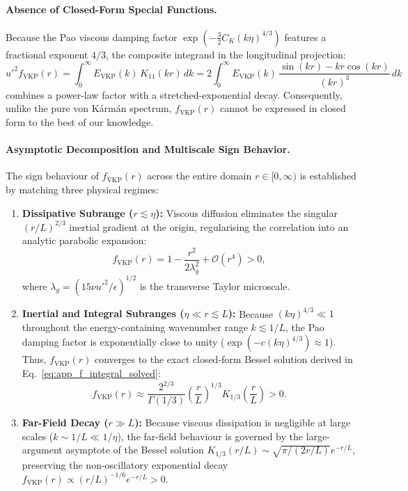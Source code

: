 \documentclass[lineno]{jfm}
\begin{document}
\paragraph{Absence of Closed-Form Special Functions.}
Because the Pao viscous damping factor $\exp(-\frac{3}{2} C_K (k\eta)^{4/3})$ features a fractional exponent $4/3$, the composite integrand in the longitudinal projection:
\begin{equation}
u'^2 f_{\text{VKP}}(r) = \int_0^\infty E_{\text{VKP}}(k)\,K_{11}(kr)\,dk = 2 \int_0^\infty E_{\text{VKP}}(k)\,\frac{\sin(kr) - kr\cos(kr)}{(kr)^3}\,dk
\end{equation}
combines a power-law factor with a stretched-exponential decay. Consequently, unlike the pure von K\'arm\'an spectrum, $f_{\text{VKP}}(r)$ cannot be expressed in closed form to the best of our knowledge.

\paragraph{Asymptotic Decomposition and Multiscale Sign Behavior.}
The sign behaviour of $f_{\text{VKP}}(r)$ across the entire domain $r \in [0, \infty)$ is established by matching three physical regimes:
\begin{enumerate}
\item \textbf{Dissipative Subrange ($r \lesssim \eta$):} Viscous diffusion eliminates the singular $(r/L)^{2/3}$ inertial gradient at the origin, regularising the correlation into an analytic parabolic expansion:
\begin{equation}
f_{\text{VKP}}(r) = 1 - \frac{r^2}{2\lambda_g^2} + \mathcal{O}(r^4) > 0,
\end{equation}
where $\lambda_g = \left( 15\nu u'^2/\epsilon \right)^{1/2}$ is the transverse Taylor microscale.
\item \textbf{Inertial and Integral Subranges ($\eta \ll r \lesssim L$):} Because $(k\eta)^{4/3} \ll 1$ throughout the energy-containing wavenumber range $k \lesssim 1/L$, the Pao damping factor is exponentially close to unity ($\exp(-c(k\eta)^{4/3}) \approx 1$). Thus, $f_{\text{VKP}}(r)$ converges to the exact closed-form Bessel solution derived in Eq.~\eqref{eq:app_f_integral_solved}:
\begin{equation}
f_{\text{VKP}}(r) \approx \frac{2^{2/3}}{\Gamma(1/3)}\left(\frac{r}{L}\right)^{1/3} K_{1/3}\left(\frac{r}{L}\right) > 0.
\end{equation}
\item \textbf{Far-Field Decay ($r \gg L$):} Because viscous dissipation is negligible at large scales ($k \sim 1/L \ll 1/\eta$), the far-field behaviour is governed by the large-argument asymptote of the Bessel solution $K_{1/3}(r/L) \sim \sqrt{\pi / (2r/L)} e^{-r/L}$, preserving the non-oscillatory exponential decay $f_{\text{VKP}}(r) \propto (r/L)^{-1/6} e^{-r/L} > 0$.
\end{enumerate}
\end{document}

